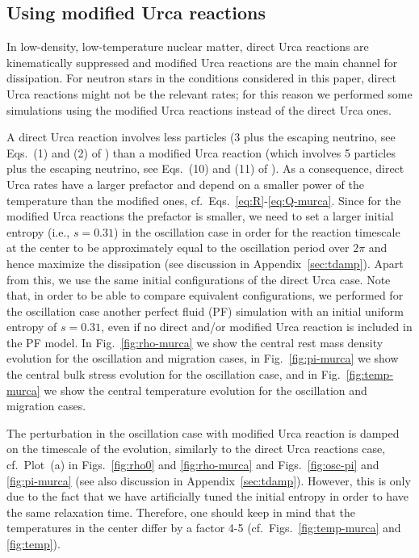 \documentclass[aps,prd,twocolumn,a4paper,floatfix,nofootbib,superscriptaddress,nofootinbib]{revtex4}
\begin{document}
\subsection{Using modified Urca reactions}
\label{ssec:results:murca}

In low-density, low-temperature nuclear matter, direct Urca reactions are
kinematically suppressed and modified Urca reactions are the main channel for
dissipation.
%
For neutron stars in the conditions considered in this paper, direct Urca
reactions might not be the relevant rates; for this reason we performed some
simulations using the modified Urca reactions instead of the direct Urca ones.

A direct Urca reaction involves less particles (3 plus the escaping neutrino,
see Eqs.~(1) and (2) of \citet{Haensel92}) than a modified Urca reaction (which
involves 5 particles plus the escaping neutrino, see Eqs.~(10) and (11) of
\citet{Haensel92}).
%
As a consequence, direct Urca rates have a larger prefactor and depend on a
smaller power of the temperature than the modified ones,
cf.~Eqs.~\eqref{eq:R}-\eqref{eq:Q-murca}.
%
Since for the modified Urca reactions the prefactor is smaller, we need to set
a larger initial entropy (i.e., $s=0.31$) in the oscillation case in order
for the reaction timescale at the center to be approximately equal to the
oscillation period over $2\pi$ and hence maximize the dissipation (see
discussion in Appendix~\ref{sec:tdamp}).
%
Apart from this, we use the same initial configurations of the direct Urca
case.
%
Note that, in order to be able to compare equivalent configurations, we
performed for the oscillation case another perfect fluid (PF) simulation with
an initial uniform entropy of $s=0.31$, even if no direct and/or modified Urca
reaction is included in the PF model.
%
In Fig.~\ref{fig:rho-murca} we show the central rest mass density evolution for
the oscillation and migration cases,
%
in Fig.~\ref{fig:pi-murca} we show the central bulk stress evolution for the
oscillation case,
%
and in Fig.~\ref{fig:temp-murca} we show the central temperature evolution for
the oscillation and migration cases.

The perturbation in the oscillation case with modified Urca reaction is damped
on the timescale of the evolution, similarly to the direct Urca reactions case,
cf.~Plot~(a) in Figs.~\ref{fig:rho0} and \ref{fig:rho-murca} and
Figs.~\ref{fig:osc-pi} and \ref{fig:pi-murca} (see also discussion in
Appendix~\ref{sec:tdamp}).
%
However, this is only due to the fact that we have artificially
tuned the initial entropy in order to have the same relaxation time.
%
Therefore, one should keep in mind that the temperatures in the center differ
by a factor 4-5 (cf.~Figs.~\ref{fig:temp-murca} and \ref{fig:temp}).
\end{document}
